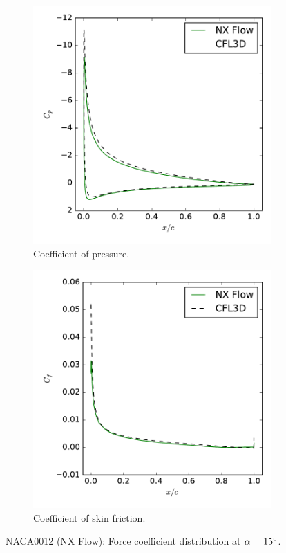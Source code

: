 \begin{figure}[ht!]
\centering
\begin{subfigure}{.45\textwidth}
  \centering
  \includegraphics[width=1.0\textwidth]{figs/naca0012/cp_15.pdf}
  \caption{Coefficient of pressure.}
\end{subfigure}%
\begin{subfigure}{.45\textwidth}
  \centering
  \includegraphics[width=1.0\textwidth]{figs/naca0012/cf_15.pdf}
  \caption{Coefficient of skin friction.}
\end{subfigure}
\caption{NACA0012 (NX Flow): Force coefficient distribution at $\alpha = 15^\circ$.}
\label{fig:naca0012_15}
\end{figure}